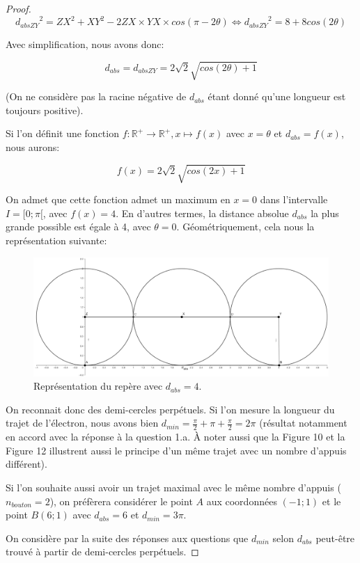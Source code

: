 \documentclass[a4paper]{amsart}
\theoremstyle{definition}
\theoremstyle{remark}
\numberwithin{equation}{section}
\begin{document}
\begin{proof}
  \[{d_{abs ZY}}^2=ZX^2+XY^2-2ZX\times YX\times cos(\pi-2\theta) \Leftrightarrow {d_{abs ZY}}^2=8+8cos(2\theta)\]

  Avec simplification, nous avons donc:

  \[d_{abs}={d_{abs ZY}}=2\sqrt{2}\sqrt{cos(2\theta)+1}\]

  (On ne considère pas la racine négative de $d_{abs}$ étant donné qu'une longueur est toujours positive).

  Si l'on définit une fonction $f:\mathbb{R^+}\longrightarrow \mathbb{R^+}, x\longmapsto f(x)$ avec $x=\theta$ et $d_{abs}=f(x)$, nous aurons:

  \[f(x)=2\sqrt{2}\sqrt{cos(2x)+1}\]

  On admet que cette fonction admet un maximum en $x=0$ dans l'intervalle $I=[0;\pi[$, avec $f(x)=4$. En d'autres termes, la distance absolue $d_{abs}$ la plus grande possible est égale à 4, avec $\theta=0$. Géométriquement, cela nous la représentation suivante:

  \begin{figure}[H]
    \centering
    \includegraphics[scale=0.18]{images/perfect_run.png}
    \caption{Représentation du repère avec $d_{abs}=4$.}
  \end{figure}

  On reconnait donc des demi-cercles perpétuels. Si l'on mesure la longueur du trajet de l'électron, nous avons bien $d_{min}=\frac{\pi}{2}+\pi+\frac{\pi}{2}=2\pi$ (résultat notamment en accord avec la réponse à la question 1.a. À noter aussi que la Figure 10 et la Figure 12 illustrent aussi le principe d'un même trajet avec un nombre d'appuis différent).

  Si l'on souhaite aussi avoir un trajet maximal avec le même nombre d'appuis ($n_{bouton}=2$), on préfèrera considérer le point $A$ aux coordonnées $(-1;1)$ et le point $B(6;1)$ avec $d_{abs}=6$ et $d_{min}=3\pi$.

  On considère par la suite des réponses aux questions que $d_{min}$ selon $d_{abs}$ peut-être trouvé à partir de demi-cercles perpétuels.

\end{proof}
\end{document}
